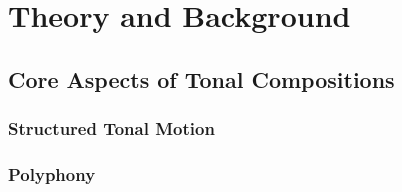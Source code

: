 %
%
%






\setlength{\parindent}{0pt}
\setlength{\parskip}{0pt} %
% 
% 
% 
% 
% 

\cleardoublepage
{}
\tableofcontents

% 


\setlength{\parskip}{1em}


\mainmatter

\cleardoublepage
\part{Theory and Background}
\chapter{Core Aspects of Tonal Compositions}
    \section{Structured Tonal Motion}
    \section{Polyphony}

